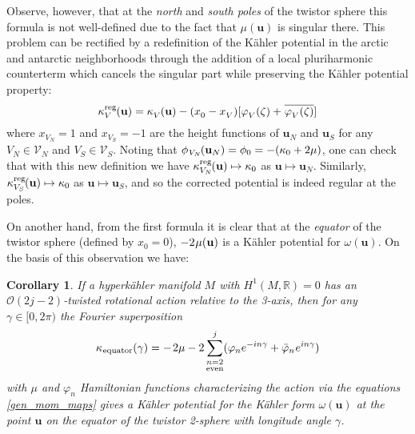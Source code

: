 \documentclass[11pt]{amsart}
\newtheorem{corollary}[theorem]{Corollary}
\theoremstyle{remark}
\theoremstyle{remark}
\theoremstyle{definition}
\theoremstyle{definition}
\theoremstyle{definition}
\newcommand{\0}{{\scriptstyle 0'}} %
\newcommand{\1}{{\scriptstyle 1'}}
\newcommand{\pt}{\hspace{1pt}} %
\newcommand{\hp}{\hspace{0.5pt}} %
\newcommand{\npt}{\hspace{-1pt}} %
\newcommand{\nhp}{\hspace{-0.5pt}} %
\begin{document}
Observe, however, that at the \textit{north} and \textit{south poles} of the twistor sphere this formula is not well-defined due to the fact that $\mu(\mathbf{u})$ is singular there. This problem can be rectified by a redefinition of the K\"ahler potential in the arctic and antarctic neighborhoods through the addition of a local pluriharmonic counter\-term which cancels the singular part while preserving the K\"ahler potential property: 
\begin{equation}
\kappa^{\text{reg}}_V\nhp(\mathbf{u}) = \kappa^{\phantom{g}}_V\nhp(\mathbf{u}) - (x^{\phantom{g}}_0 - x^{\phantom{g}}_V) [\varphi^{\phantom{g}}_{V}(\zeta) + \hp \overline{\varphi^{\phantom{.}}_{V}(\zeta)}]
\end{equation}
where $x_{V_N} = 1$ and $x_{V_S} = -1$ are the height functions of $\mathbf{u}_N$ and $\mathbf{u}_S$ for any $V_N \in \mathscr{V}_N$ and $V_S \in \mathscr{V}_S$. Noting that $\phi_{\hp V_N}\npt(\mathbf{u}_N) = \phi_0 = -(\kappa_0 + 2\mu)$, one can check that with this new definition we have $\kappa^{\text{reg}}_{V_N}\npt(\mathbf{u}) \mapsto \kappa_0$ as $\mathbf{u} \mapsto \mathbf{u}_N$. Similarly, $\kappa^{\text{reg}}_{V_S}\npt(\mathbf{u}) \mapsto \kappa_0$ as $\mathbf{u} \mapsto \mathbf{u}_S$, and so the corrected potential is indeed regular at the poles. 
 
On another hand, from the first formula it is clear that at the \textit{equator} of the twistor sphere (defined by $x_0 = 0$), $-2 \hp \mu(\mathbf{u})$ is a K\"ahler potential for $\omega(\mathbf{u})$. On the basis of this observation we have: 

\begin{corollary} \label{poles-equator}
If a hyperk\"ahler manifold $M$ with $H^1(M,\mathbb{R}) = 0$ has an $\mathcal{O}(2j-2)$-twisted rotational action relative to the 3-axis, then for any $\gamma \in [0,2\pi)$ the Fourier superposition 
\begin{equation}
\kappa_{\hp \textup{equator}}(\gamma) = - \pt 2\mu - 2 \sum_{\substack{n=2 \\ \textup{even}}}^j (\varphi_n e^{-i n \gamma} + \bar{\varphi}_n \hp e^{i n \gamma})
\end{equation}
with $\mu$ and $\varphi_n$ Hamiltonian functions characterizing the action via the equations \eqref{gen_mom_maps} gives a K\"ahler potential for the K\"ahler form $\omega(\mathbf{u})$ at the point $\mathbf{u}$ on the equator of the twistor 2-sphere with longitude angle $\gamma$.
\end{corollary}
\end{document}
